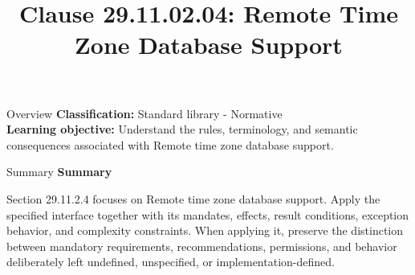 \documentclass[10pt,letterpaper]{article}
\title{Clause 29.11.02.04: Remote Time Zone Database Support}
\author{}
\date{}
\begin{document}
\maketitle
\begin{CornellOverviewBox}{Overview}
\textbf{Classification:} Standard library - Normative\\[2pt]
\textbf{Learning objective:} Understand the rules, terminology, and semantic consequences associated with Remote time zone database support.
\end{CornellOverviewBox}\begin{CornellSummaryBox}{Summary}
{\sffamily\bfseries\color{Accent} Summary}\par\vspace{3pt}Section 29.11.2.4 focuses on Remote time zone database support. Apply the specified interface together with its mandates, effects, result conditions, exception behavior, and complexity constraints. When applying it, preserve the distinction between mandatory requirements, recommendations, permissions, and behavior deliberately left undefined, unspecified, or implementation-defined.
\end{CornellSummaryBox}
\end{document}

